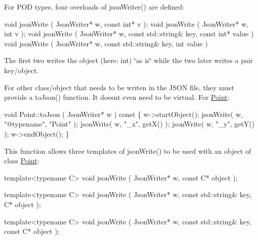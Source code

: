 For P\+OD types, four overloads of {\ttfamily json\+Writer()} are defined\+:


\begin{DoxyCode}
\textcolor{keywordtype}{void}  jsonWrite ( JsonWriter* w, \textcolor{keyword}{const} \textcolor{keywordtype}{int}* v );
\textcolor{keywordtype}{void}  jsonWrite ( JsonWriter* w,       \textcolor{keywordtype}{int}  v );
\textcolor{keywordtype}{void}  jsonWrite ( JsonWriter* w, \textcolor{keyword}{const} std::string& key, \textcolor{keyword}{const} \textcolor{keywordtype}{int}* value )
\textcolor{keywordtype}{void}  jsonWrite ( JsonWriter* w, \textcolor{keyword}{const} std::string& key,       \textcolor{keywordtype}{int}  value )
\end{DoxyCode}


The first two writes the object (here\+: {\ttfamily int}) \char`\"{}as is\char`\"{} while the two later writes a pair key/object.

For other class/object that needs to be writen in the J\+S\+ON file, they must provide a {\ttfamily to\+Json()} function. It doesn\textquotesingle{}t even need to be virtual. For \mbox{\hyperlink{classHurricane_1_1Point}{Point}}\+:


\begin{DoxyCode}
\textcolor{keywordtype}{void}  Point::toJson ( JsonWriter* w )\textcolor{keyword}{ const}
\textcolor{keyword}{}\{
  w->startObject();
  jsonWrite( w, \textcolor{stringliteral}{"@typename"}, \textcolor{stringliteral}{"Point"} );
  jsonWrite( w, \textcolor{stringliteral}{"\_x"}, getX() );
  jsonWrite( w, \textcolor{stringliteral}{"\_y"}, getY() );
  w->endObject();
\}
\end{DoxyCode}


This function allows three templates of {\ttfamily json\+Write()} to be used with an object of class \mbox{\hyperlink{classHurricane_1_1Point}{Point}}\+:


\begin{DoxyCode}
\textcolor{keyword}{template}<\textcolor{keyword}{typename} C>
\textcolor{keywordtype}{void}  jsonWrite ( JsonWriter* w, \textcolor{keyword}{const} C* \textcolor{keywordtype}{object} );

\textcolor{keyword}{template}<\textcolor{keyword}{typename} C>
\textcolor{keywordtype}{void}  jsonWrite ( JsonWriter* w, \textcolor{keyword}{const} std::string& key, C* \textcolor{keywordtype}{object} );

\textcolor{keyword}{template}<\textcolor{keyword}{typename} C>
\textcolor{keywordtype}{void}  jsonWrite ( JsonWriter* w, \textcolor{keyword}{const} std::string& key, \textcolor{keyword}{const} C* \textcolor{keywordtype}{object} );
\end{DoxyCode}



